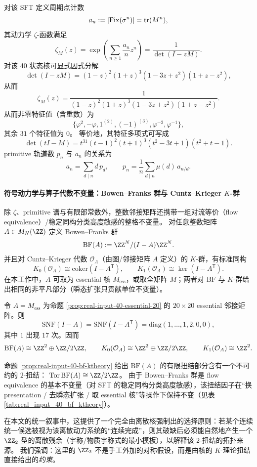 

对该 SFT 定义周期点计数
\[
a_n:=|{\rm Fix}(\sigma^n)|=\operatorname{tr}(M^n),
\]
其动力学 $\zeta$-函数满足
\[
\zeta_M(z)=\exp\!\left(\sum_{n\ge 1}\frac{a_n}{n}z^n\right)=\frac{1}{\det(I-zM)}.
\]
对该 40 状态核可显式因式分解
\[
\det(I-zM)=(1-z)^2(1+z)^3(1-3z+z^2)(1+z-z^2),
\]
从而
\[
\zeta_M(z)=\frac{1}{(1-z)^2(1+z)^3(1-3z+z^2)(1+z-z^2)}.
\]
从而非零特征值（含重数）为
\[
\{\varphi^2,-\varphi,1^{(2)},(-1)^{(3)},\varphi^{-2},\varphi^{-1}\},
\]
其余 $31$ 个特征值为 $0$。
等价地，其特征多项式可写成
\[
\det(tI-M)=t^{31}(t-1)^2(t+1)^3(t^2-3t+1)(t^2+t-1).
\]
primitive 轨道数 $p_n$ 与 $a_n$ 的关系为
\[
a_n=\sum_{d\mid n} d\,p_d,\qquad
p_n=\frac{1}{n}\sum_{d\mid n}\mu(d)\,a_{n/d}.
\]

\paragraph{符号动力学与算子代数不变量：Bowen--Franks 群与 Cuntz--Krieger \texorpdfstring{$K$}{K}-群}
除 $\zeta$、primitive 谱与有限部常数外，整数邻接矩阵还携带一组对流等价（flow equivalence）/稳定同构分类高度敏感的整格不变量。
对任意整数矩阵 $A\in M_N(\ZZ)$ 定义 Bowen--Franks 群
\[
\mathrm{BF}(A):=\ZZ^N/(I-A)\ZZ^N.
\]
并且对 Cuntz--Krieger 代数 $\mathcal O_A$（由图/邻接矩阵 $A$ 定义）的 $K$-群，有标准同构
\[
K_0(\mathcal O_A)\cong \mathrm{coker}(I-A^\mathsf T),\qquad
K_1(\mathcal O_A)\cong \ker(I-A^\mathsf T).
\]
在本工作中，$A$ 可取为 essential 核 $M_{\mathrm{ess}}$，或取全矩阵 $M$；两者对 $\mathrm{BF}$ 与 $K$-群给出相同的非平凡部分（瞬态扩张只贡献单位不变量）。

\begin{proposition}\label{prop:real-input-40-bf-ktheory}
令 $A=M_{\mathrm{ess}}$ 为命题 \ref{prop:real-input-40-essential-20} 的 $20\times 20$ essential 邻接矩阵。则
\[
\mathrm{SNF}(I-A)=\mathrm{SNF}(I-A^\mathsf T)=\mathrm{diag}(1,\dots,1,2,0,0),
\]
其中 $1$ 出现 $17$ 次。因而
\[
\mathrm{BF}(A)\cong \ZZ^2\oplus \ZZ/2\ZZ,
\qquad
K_0(\mathcal O_A)\cong \ZZ^2\oplus \ZZ/2\ZZ,
\qquad
K_1(\mathcal O_A)\cong \ZZ^2.
\]
\end{proposition}

\begin{remark}\label{rem:bf-z2-residual-gauge}
命题 \ref{prop:real-input-40-bf-ktheory} 给出 $\mathrm{BF}(A)$ 的有限扭结部分含有一个不可约的 $2$-扭结：
\(
\mathrm{Tor}\,\mathrm{BF}(A)\cong \ZZ/2\ZZ
\)。
由于 Bowen--Franks 群是 flow equivalence 的基本不变量（对 SFT 的稳定同构分类高度敏感），该扭结因子在“换 presentation / 去瞬态扩张 / 取 essential 核”等操作下保持不变（见表 \ref{tab:real_input_40_bf_ktheory}）。
\par
在本文的统一叙事中，这提供了一个完全由离散核强制出的选择原则：若某个连续统一候选被视为该离散动力系统的“连续完成”，则其破缺后必须能自然地产生一个 \(\ZZ_2\) 型的离散残余（宇称/物质宇称式的最小模板），以解释该 $2$-扭结的拓扑来源。
我们强调：这里的 \(\ZZ_2\) 不是手工外加的对称假设，而是由核的 $K$-理论扭结直接给出的\emph{约束}。
\end{remark}

